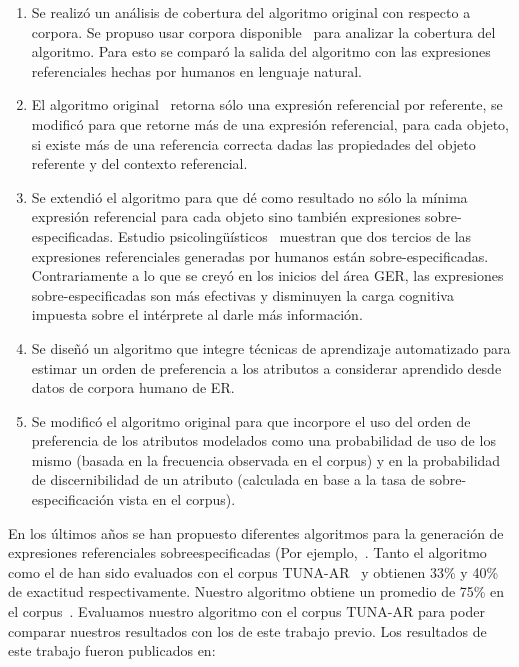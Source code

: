 \begin{enumerate}
   \item Se realiz\'o un an\'alisis de cobertura del algoritmo original con respecto a corpora. Se propuso usar corpora disponible~\cite{viethen-dale:2011:UCNLG+Eval} para analizar la cobertura del algoritmo. Para esto se compar\'o la salida del algoritmo con las expresiones referenciales hechas por humanos en lenguaje natural. 
   \item El algoritmo original~\cite{Areces2008} retorna s\'olo una expresi\'on referencial por referente, se modific\'o para que retorne m\'as de una expresi\'on referencial, para cada objeto, si existe m\'as de una referencia correcta dadas las propiedades del objeto referente y del contexto referencial.
   \item Se extendi\'o el algoritmo para que d\'e como resultado no s\'olo la m\'inima expresi\'on referencial para cada objeto sino tambi\'en expresiones sobre-especificadas. Estudio psicoling\"u\'isticos~\cite{} muestran que dos tercios de las expresiones referenciales generadas por humanos est\'an sobre-especificadas. Contrariamente a lo que se crey\'o en los inicios del \'area GER, las expresiones sobre-especificadas son m\'as efectivas y disminuyen la carga cognitiva impuesta sobre el int\'erprete al darle m\'as informaci\'on. 
   \item Se dise\~n\'o un algoritmo que integre t\'ecnicas de aprendizaje automatizado para estimar un orden de preferencia a los atributos a considerar aprendido desde datos de corpora humano de ER.
   \item Se modific\'o el algoritmo original para que incorpore el uso del orden de preferencia de los atributos modelados como una probabilidad de uso de los mismo (basada en la frecuencia observada en el corpus) y en la probabilidad de discernibilidad de un atributo (calculada en base a la tasa de sobre-especificaci\'on vista en el corpus).
\end{enumerate}

En los \'ultimos a\~nos se han propuesto diferentes algoritmos para la generaci\'on de expresiones referenciales sobreespecificadas (Por ejemplo,~\cite{ruudINLG2012}. Tanto el algoritmo~\cite{delucenaENLG} como el de \cite{ruudINLG2012} han sido evaluados con el corpus TUNA-AR~\cite{gattENLG} y obtienen 33\% y 40\% de exactitud respectivamente. Nuestro algoritmo obtiene un promedio de 75\% en el corpus~\cite{viethen-dale:2011:UCNLG+Eval}. Evaluamos nuestro algoritmo con el corpus TUNA-AR para poder comparar nuestros resultados con los de este trabajo previo. Los resultados de este trabajo fueron publicados en:


